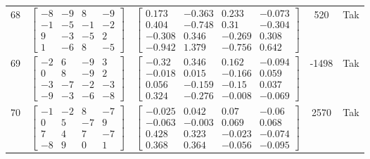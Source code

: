 \documentclass[a4paper,12pt]{article}
\begin{document}
\begin{tabular}{c c c c c}
68
&
$\begin{bmatrix} -8 & -9 & 8 & -9 \\ -1 & -5 & -1 & -2 \\ 9 & -3 & -5 & 2 \\ 1 & -6 & 8 & -5 \end{bmatrix}$
&
$\begin{bmatrix} 0.173 & -0.363 & 0.233 & -0.073 \\ 0.404 & -0.748 & 0.31 & -0.304 \\ -0.308 & 0.346 & -0.269 & 0.308 \\ -0.942 & 1.379 & -0.756 & 0.642 \end{bmatrix}$
&
520
&
Tak
\\
69
&
$\begin{bmatrix} -2 & 6 & -9 & 3 \\ 0 & 8 & -9 & 2 \\ -3 & -7 & -2 & -3 \\ -9 & -3 & -6 & -8 \end{bmatrix}$
&
$\begin{bmatrix} -0.32 & 0.346 & 0.162 & -0.094 \\ -0.018 & 0.015 & -0.166 & 0.059 \\ 0.056 & -0.159 & -0.15 & 0.037 \\ 0.324 & -0.276 & -0.008 & -0.069 \end{bmatrix}$
&
-1498
&
Tak
\\
70
&
$\begin{bmatrix} -1 & -2 & 8 & -7 \\ 0 & 5 & -7 & 9 \\ 7 & 4 & 7 & -7 \\ -8 & 9 & 0 & 1 \end{bmatrix}$
&
$\begin{bmatrix} -0.025 & 0.042 & 0.07 & -0.06 \\ -0.063 & -0.003 & 0.069 & 0.068 \\ 0.428 & 0.323 & -0.023 & -0.074 \\ 0.368 & 0.364 & -0.056 & -0.095 \end{bmatrix}$
&
2570
&
Tak
\\
\end{tabular} \egroup \newpage
\end{document}
